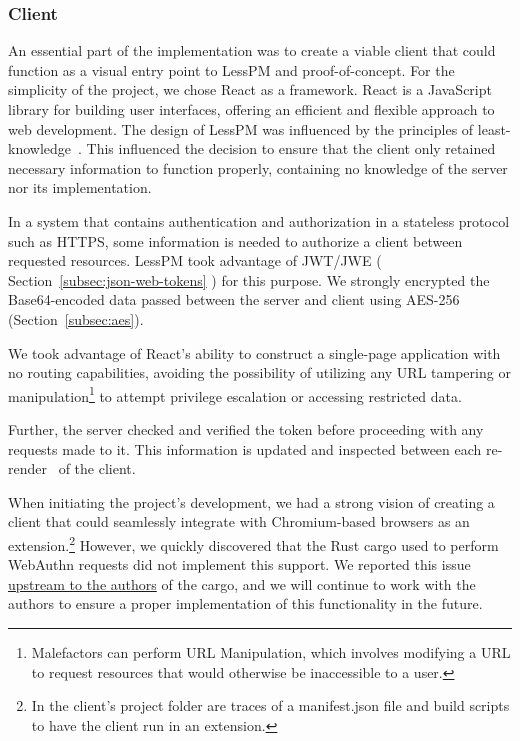 \subsubsection{Client}
An essential part of the implementation was to create a viable client that could
function as a visual entry point to LessPM and proof-of-concept.
For the simplicity of the project, we chose React as a framework.
React is a JavaScript library for building user interfaces, offering an
efficient and flexible approach to web development.
The design of LessPM was influenced by the principles of
least-knowledge~\cite{lieberherr1990assuring}.
This influenced the decision to ensure that the client only retained
necessary information to function properly, containing no knowledge of
the server nor its implementation.

In a system that contains authentication and authorization in a stateless
protocol such as HTTPS, some information is needed to authorize a client
between requested resources.
LessPM took advantage of JWT/JWE (
Section~\ref{subsec:json-web-tokens}
) for this purpose.
We strongly encrypted the Base64-encoded data passed between the server and
client using AES-256 (Section~\ref{subsec:aes}).

We took advantage of React's ability to construct a single-page application with
no routing capabilities, avoiding the possibility of utilizing any URL tampering
or manipulation\footnote{
  Malefactors can perform URL Manipulation, which involves modifying a URL to
  request resources that would otherwise be inaccessible to a user.
} to attempt privilege escalation or
accessing restricted data.

Further, the server checked and verified the token before proceeding with any
requests made to it.
This information is updated and inspected between each
re-render~\cite{react-component} of the client.

When initiating the project's development, we had a strong vision of creating
a client that could seamlessly integrate with Chromium-based browsers as
an extension.\footnote{
    In the client's project folder are traces of a manifest.json file and build
    scripts to have the client run in an extension.
}
However, we quickly discovered that the Rust cargo used to perform WebAuthn
requests did not implement this support.
We reported this issue
\href{https://github.com/kanidm/webauthn-rs/issues/288}{upstream to the authors}
of the cargo, and we will continue to work with the authors to ensure a proper
implementation of this functionality in the future.

